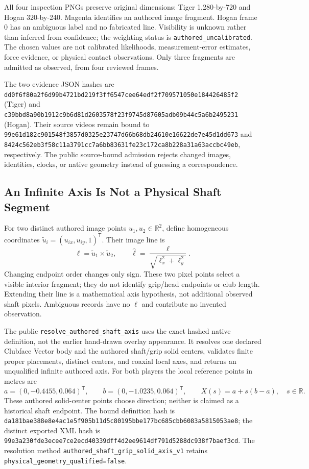 \documentclass[11pt,letterpaper]{article}
\newcommand{\code}[1]{\nolinkurl{#1}}
\newcommand{\hash}[1]{{\footnotesize\nolinkurl{#1}}}
\newcommand{\R}{\mathbb{R}}
\begin{document}
All four inspection PNGs preserve original dimensions: Tiger 1,280-by-720 and
Hogan 320-by-240. Magenta identifies an authored image fragment. Hogan frame 0
has an ambiguous label and no fabricated line. Visibility is unknown rather
than inferred from confidence; the weighting status is
\code{authored_uncalibrated}. The chosen values are not calibrated likelihoods,
measurement-error estimates, force evidence, or physical contact observations.
Only three fragments are admitted as observed, from four reviewed frames.

The two evidence JSON hashes are
\hash{dd0f6f80a2f6d99b4721bd219f3ff6547cee64edf2f709571050e184426485f2}
(Tiger) and
\hash{c39bbd8a90b1912c9b6d81d2603578f23f9745d87605adb09b44c5a6b2495231}
(Hogan). Their source videos remain bound to
\hash{99e61d182c901548f3857d0325e23747d66b68db24610e16622de7e45d1dd673}
and
\hash{8424c562eb3f58c11a3791cc7a6bb83631fe23c172ca8b228a31a63accbc49eb},
respectively. The public source-bound admission rejects changed images,
identities, clocks, or native geometry instead of guessing a correspondence.

\subsection{An Infinite Axis Is Not a Physical Shaft Segment}
For two distinct authored image points $u_1,u_2\in\R^2$, define homogeneous
coordinates $\widetilde u_i=(u_{ix},u_{iy},1)^\mathsf{T}$. Their image line is
\begin{equation}
 \ell=\widetilde u_1\times\widetilde u_2,\qquad
 \widehat\ell=\frac{\ell}{\sqrt{\ell_x^2+\ell_y^2}}.
\end{equation}
Changing endpoint order changes only sign. These two pixel points select a
visible interior fragment; they do not identify grip/head endpoints or club
length. Extending their line is a mathematical axis hypothesis, not additional
observed shaft pixels. Ambiguous records have no $\ell$ and contribute no
invented observation.

The public \code{resolve_authored_shaft_axis} uses the exact hashed native
definition, not the earlier hand-drawn overlay appearance. It resolves one
declared Clubface Vector body and the authored shaft/grip solid centers,
validates finite proper placements, distinct centers, and coaxial local axes,
and returns an unqualified infinite authored axis. For both players the local
reference points in metres are
\begin{equation}
 a=(0,-0.4455,0.064)^\mathsf{T},\qquad
 b=(0,-1.0235,0.064)^\mathsf{T},\qquad
 X(s)=a+s(b-a),\quad s\in\R.
\end{equation}
These authored solid-center points choose direction; neither is claimed as a
historical shaft endpoint. The bound definition hash is
\hash{da181bae388e8e4ac1e5f905b11d5c80195bbe177bc685cbb6083a5815053ae8};
the distinct exported XML hash is
\hash{99e3a230fde3ecee7ce2ecd40339dff4d2ee9614df791d5288dc938f7baef3cd}.
The resolution method \code{authored_shaft_grip_solid_axis_v1} retains
\code{physical_geometry_qualified=false}.
\end{document}
